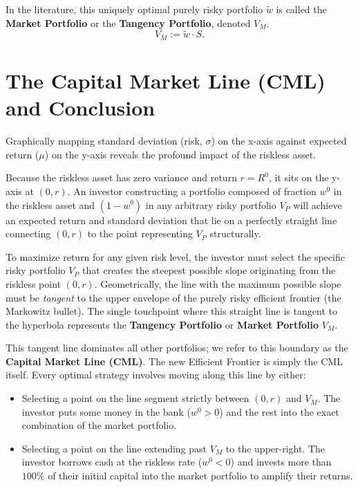 In the literature, this uniquely optimal purely risky portfolio $\tilde{w}$ is called the \textbf{Market Portfolio} or the \textbf{Tangency Portfolio}, denoted $V_M$.
\begin{equation*}
    V_M := \tilde{w} \cdot S.
\end{equation*}

\section{The Capital Market Line (CML) and Conclusion}

Graphically mapping standard deviation (risk, $\sigma$) on the x-axis against expected return ($\mu$) on the y-axis reveals the profound impact of the riskless asset.

Because the riskless asset has zero variance and return $r = R^0$, it sits on the y-axis at $(0, r)$. An investor constructing a portfolio composed of fraction $w^0$ in the riskless asset and $(1-w^0)$ in any arbitrary risky portfolio $V_P$ will achieve an expected return and standard deviation that lie on a perfectly straight line connecting $(0, r)$ to the point representing $V_P$ structurally.

To maximize return for any given risk level, the investor must select the specific risky portfolio $V_P$ that creates the steepest possible slope originating from the riskless point $(0, r)$. Geometrically, the line with the maximum possible slope must be \textit{tangent} to the upper envelope of the purely risky efficient frontier (the Markowitz bullet). The single touchpoint where this straight line is tangent to the hyperbola represents the \textbf{Tangency Portfolio} or \textbf{Market Portfolio} $V_M$.

This tangent line dominates all other portfolios; we refer to this boundary as the \textbf{Capital Market Line (CML)}. The new Efficient Frontier is simply the CML itself. Every optimal strategy involves moving along this line by either:
\begin{itemize}
    \item {} Selecting a point on the line segment strictly between $(0, r)$ and $V_M$. The investor puts some money in the bank ($w^0 > 0$) and the rest into the exact combination of the market portfolio.
    \item {} Selecting a point on the line extending past $V_M$ to the upper-right. The investor borrows cash at the riskless rate ($w^0 < 0$) and invests more than $100\%$ of their initial capital into the market portfolio to amplify their returns.
\end{itemize}

